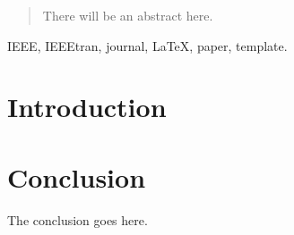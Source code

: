 \documentclass[journal]{IEEEtran}
\begin{document}
\maketitle

\begin{abstract}
There will be an abstract here.
\end{abstract}

\begin{IEEEkeywords}
IEEE, IEEEtran, journal, \LaTeX, paper, template.
\end{IEEEkeywords}


\IEEEpeerreviewmaketitle



\section{Introduction} \label{sec:intro}

\section{Conclusion}
The conclusion goes here.



%
\end{document}
